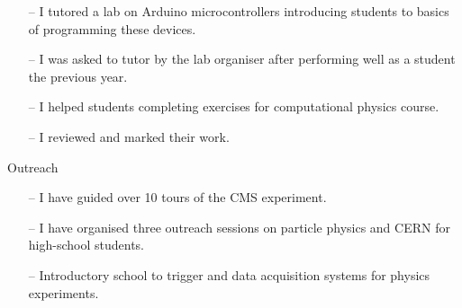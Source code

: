 \documentclass[10pt,a4paper]{altacv}
\begin{document}



\begin{itemize}
    \setlength{\itemindent}{0.5em}
    \item[--]   I tutored a lab on Arduino microcontrollers introducing students to basics of programming these devices.
    \item[--]   I was asked to tutor by the lab organiser after performing well as a student the previous year.
\end{itemize}

\medskip


\begin{itemize}
    \setlength{\itemindent}{0.5em}
    \item[--]   I helped students completing exercises for computational physics course.
    \item[--]   I reviewed and marked their work.
\end{itemize}

\medskip

{\large\color{emphasis}Outreach\par}
\smallskip

\begin{itemize}
    \setlength{\itemindent}{0.5em}
    \item[--]   I have guided over 10 tours of the CMS experiment.
    \item[--]   I have organised three outreach sessions on particle physics and CERN for high-school students.
\end{itemize}



\begin{itemize}
    \setlength{\itemindent}{0.5em}
    \item[--]   Introductory school to trigger and data acquisition systems for physics experiments.
\end{itemize}

\medskip
\end{document}
